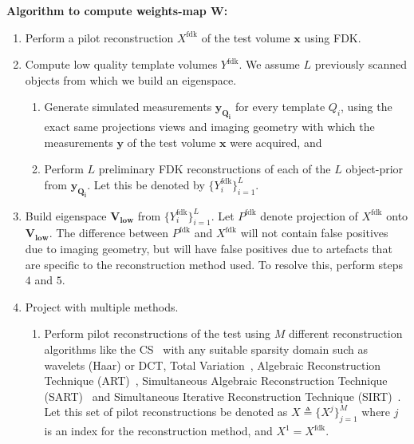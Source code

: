 \documentclass[journal]{IEEEtran}
\begin{document}
\textbf{Algorithm to compute weights-map $\boldsymbol{W}$:}
\label{sec:thealgo}
\begin{enumerate}

\item Perform a pilot reconstruction $X^{\text{fdk}}$ of the
  test volume $\boldsymbol{x}$ using FDK.

\item Compute low quality template volumes $Y^\text{fdk}$. 
We assume $L$ previously scanned objects from which we build
an eigenspace. 
\vspace{-0.1cm}

\begin{enumerate}
  \item Generate simulated measurements $\boldsymbol{y_{Q_i}}$ for
    every template $Q_i$, using the exact same projections views and
    imaging geometry with which the measurements $\boldsymbol{y}$ of
    the test volume $\boldsymbol{x}$ were acquired, and
\item Perform $L$ preliminary FDK reconstructions of each of the $L$
  object-prior from $\boldsymbol{y_{Q_i}}$.  Let this be denoted by
  $\{Y^{\text{fdk}}_i\}_{i=1}^L$.
  \end{enumerate}
\item Build eigenspace $\boldsymbol{V_{\text{low}}}$ from
  $\{Y^{\text{fdk}}_i\}_{i=1}^L$.  Let $P^{\text{fdk}}$ denote
  projection of $X^{\text{fdk}}$ onto
  $\boldsymbol{V_{\text{low}}}$. The difference between
  $P^{\text{fdk}}$ and $X^{\text{fdk}}$ will not contain false
  positives due to imaging geometry, but will have false positives due
  to artefacts that are specific to the reconstruction method used. To
  resolve this, perform steps $4$ and $5$.
\item Project with multiple methods.
  \begin{enumerate}
  \item Perform pilot reconstructions of the test using $M$ different
    reconstruction algorithms like the CS~\cite{lasso} with any
    suitable sparsity domain such as wavelets (Haar) or  DCT, Total
    Variation~\cite{TV}, Algebraic Reconstruction Technique
    (ART)~\cite{art}, Simultaneous Algebraic Reconstruction Technique
    (SART)~\cite{sart} and Simultaneous Iterative Reconstruction
    Technique (SIRT)~\cite{sirt}. Let this set of pilot
    reconstructions be denoted as $X \triangleq \{X^j\}_{j=1}^M$ where
    $j$ is an index for the reconstruction method, and $X^1 =
    X^{\text{fdk}}$.


\end{enumerate}
\end{enumerate}
\end{document}
